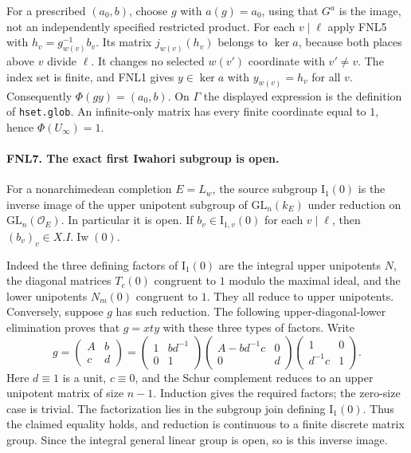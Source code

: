 \documentclass[11pt,a4paper]{article}
\numberwithin{equation}{section}
\theoremstyle{remark}\newtheorem{remark}[theorem]{Remark}
\begin{document}
For a prescribed \((a_0,\allowbreak{} b)\), choose \(g\) with \(a(g)=a_0\), using
that \(G^a\) is the image, not an independently specified restricted
product.  For each \(v\mid\ell\) apply FNL5 with
\(h_v=g_{w(v)}^{-1}b_v\).  Its matrix \(j_{w(v)}(h_v)\) belongs to
\(\ker a\), because both places above \(v\) divide \(\ell\).
It changes no selected \(w(v')\) coordinate with \(v'\ne v\).
The index set is finite, and FNL1 gives \(y\in\ker a\) with
\(y_{w(v)}=h_v\) for all \(v\).  Consequently \(\Phi(gy)=(a_0,\allowbreak{} b)\).
On \(\Gamma\) the displayed expression is the definition of
\texttt{hset.\allowbreak glob}.  An infinite-only matrix has every finite
coordinate equal to \(1\), hence \(\Phi(U_\infty)=1\).

\paragraph{FNL7. The exact first Iwahori subgroup is open.}
\label{claim:FNL7}
For a nonarchimedean completion \(E=L_w\), the source subgroup
\(\mathrm{I}_1(0)\) is the inverse image of the upper unipotent
subgroup of \(\mathrm{GL}_n(k_E)\) under reduction on
\(\mathrm{GL}_n(\mathcal O_E)\).  In particular it is open.  If
\(b_v\in\mathrm{I}_{1,\allowbreak{} v}(0)\) for each \(v\mid\ell\), then
\((b_v)_v\in X.I.\operatorname{Iw}(0)\).

Indeed the three defining factors of \(\mathrm{I}_1(0)\) are the
integral upper unipotents \(N\), the diagonal matrices
\(T_c(0)\) congruent to \(1\) modulo the maximal ideal, and the
lower unipotents \(N_m(0)\) congruent to \(1\).  They all reduce
to upper unipotents.  Conversely, suppose \(g\) has such reduction.
The following upper-diagonal-lower elimination proves that
\(g=x t y\) with these three types of factors.  Write
\[
 g=\begin{pmatrix}A&b\\c&d\end{pmatrix}
 =\begin{pmatrix}1&bd^{-1}\\0&1\end{pmatrix}
  \begin{pmatrix}A-bd^{-1}c&0\\0&d\end{pmatrix}
  \begin{pmatrix}1&0\\d^{-1}c&1\end{pmatrix}.
\]
Here \(d\equiv1\) is a unit, \(c\equiv0\), and the Schur
complement reduces to an upper unipotent matrix of size \(n-1\).
Induction gives the required factors; the zero-size case is trivial.
The factorization lies in the subgroup join defining \(\mathrm I_1(0)\).
Thus the claimed equality holds, and reduction is continuous to a
finite discrete matrix group.  Since the integral general linear
group is open, so is this inverse image.
\end{document}
